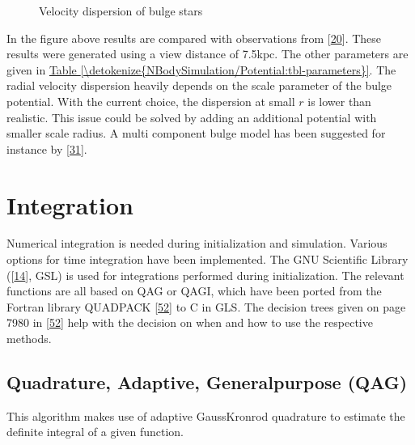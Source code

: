 \documentclass[letterpaper,10pt,english]{sphinxmanual}
\begin{document}
\begin{figure}[htbp]
\centering
\capstart

\noindent{}
\caption{Velocity dispersion of bulge stars}\label{\detokenize{NBodySimulation/Initialization:id46}}\end{figure}

\sphinxAtStartPar
In the figure above results are compared with observations from {[}\hyperlink{cite.NBodySimulation/Appendix:id21}{20}{]}. These results were generated using a view distance of 7.5kpc.
The other parameters are given in \hyperref[\detokenize{NBodySimulation/Potential:tbl-parameters}]{Table \ref{\detokenize{NBodySimulation/Potential:tbl-parameters}}}. The radial velocity dispersion heavily depends on the scale parameter of the bulge potential.
With the current choice, the dispersion at small \(r\) is lower than realistic. This issue could be solved by adding an additional potential with smaller scale radius.
A multi component bulge model has been suggested for instance by {[}\hyperlink{cite.NBodySimulation/Appendix:id22}{31}{]}.


\chapter{Integration}
\label{\detokenize{NBodySimulation/Integration:integration}}\label{\detokenize{NBodySimulation/Integration::doc}}
\sphinxAtStartPar
Numerical integration is needed during initialization and simulation.
Various options for time integration have been implemented.
The GNU Scientific Library ({[}\hyperlink{cite.NBodySimulation/Appendix:id24}{14}{]}, GSL) is used for integrations performed during initialization.
The relevant functions are all based on QAG or QAGI, which have been ported from the Fortran library QUADPACK {[}\hyperlink{cite.NBodySimulation/Appendix:id25}{52}{]} to C in GLS.
The decision trees given on page 79\sphinxhyphen{}80 in {[}\hyperlink{cite.NBodySimulation/Appendix:id25}{52}{]} help with the decision on when and how to use the respective methods.


\section{Quadrature, Adaptive, General\sphinxhyphen{}purpose (QAG)}
\label{\detokenize{NBodySimulation/Integration:quadrature-adaptive-general-purpose-qag}}
\sphinxAtStartPar
This algorithm makes use of adaptive Gauss\sphinxhyphen{}Kronrod quadrature to estimate the definite integral of a given function.
\end{document}
